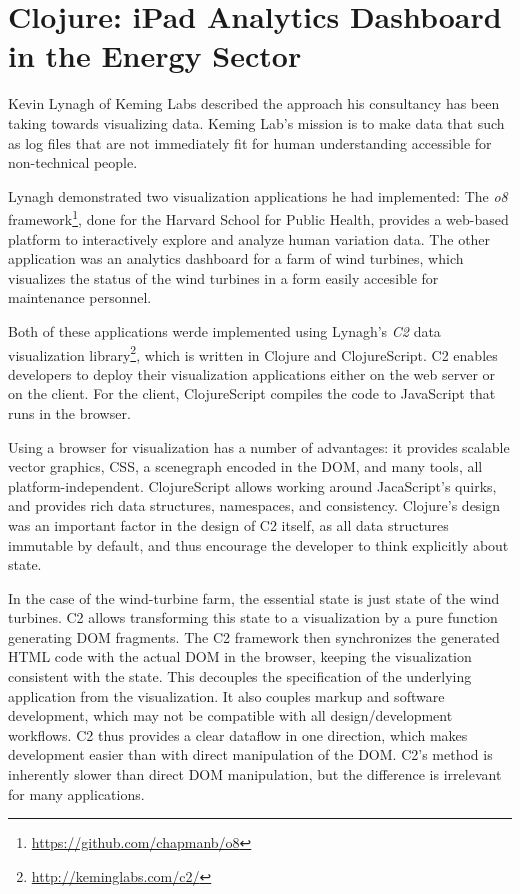 \documentclass{jfp1}
\begin{document}
\section{Clojure: iPad Analytics Dashboard in the Energy Sector}

Kevin Lynagh of Keming Labs described the approach his consultancy has
been taking towards visualizing data.  Keming Lab's mission is to make
data that such as log files that are not immediately fit for human
understanding accessible for non-technical people.  

Lynagh demonstrated two visualization applications he had implemented:
The \textit{o8}
framework\footnote{\url{https://github.com/chapmanb/o8}}, done for the
Harvard School for Public Health, provides a web-based platform to
interactively explore and analyze human variation data.  The other
application was an analytics dashboard for a farm of wind turbines,
which visualizes the status of the wind turbines in a form easily
accesible for maintenance personnel.

Both of these applications werde implemented using Lynagh's
\textit{C2} data visualization
library\footnote{\url{http://keminglabs.com/c2/}}, which is written in
Clojure and ClojureScript.  C2 enables developers to deploy their
visualization applications either on the web server or on the client.
For the client, ClojureScript compiles the code to JavaScript that
runs in the browser.

Using a browser for visualization has a number of advantages: it
provides scalable vector graphics, CSS, a scenegraph encoded in the
DOM, and many tools, all platform-independent.  ClojureScript allows
working around JacaScript's quirks, and provides rich data structures,
namespaces, and consistency.  Clojure's design was an important factor
in the design of C2 itself, as all data structures immutable by
default, and thus encourage the developer to think explicitly about
state.

In the case of the wind-turbine farm, the essential state is just
state of the wind turbines.  C2 allows transforming this state to a
visualization by a pure function generating DOM fragments.  The C2
framework then synchronizes the generated HTML code with the actual
DOM in the browser, keeping the visualization consistent with the
state.  This decouples the specification of the underlying application
from the visualization.  It also couples markup and software
development, which may not be compatible with all design/development
workflows.  C2 thus provides a clear dataflow in one direction, which
makes development easier than with direct manipulation of the DOM.
C2's method is inherently slower than direct DOM manipulation, but the
difference is irrelevant for many applications.
\end{document}
